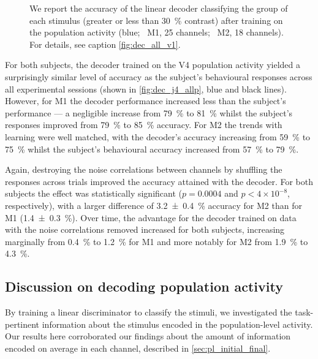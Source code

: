 \begin{figure}[htbp]
{    }
    \hspace*{\fill}
    \caption{%
    We report the accuracy of the linear decoder classifying the group of each stimulus (greater or less than \SI{30}{\percent} contrast) after training on the population activity (blue; \protect{}~\ac{M1}, \num{25} channels; \protect{}~\ac{M2}, \num{18} channels).
    For details, see caption \autoref{fig:dec_all_v1}.
}
    \label{fig:dec_all_v4}
\end{figure}

For both subjects, the decoder trained on the \ac{V4} population activity yielded a surprisingly similar level of accuracy as the subject's behavioural responses across all experimental sessions (shown in \autoref{fig:dec_j4_allp}, blue and black lines).
However, for \ac{M1} the decoder performance increased less than the subject's performance --- a negligible increase from \SI{79}{\percent} to \SI{81}{\percent} whilst the subject's responses improved from \SI{79}{\percent} to \SI{85}{\percent} accuracy.
For \ac{M2} the trends with learning were well matched, with the decoder's accuracy increasing from \SI{59}{\percent} to \SI{75}{\percent} whilst the subject's behavioural accuracy increased from \SI{57}{\percent} to \SI{79}{\percent}.

Again, destroying the noise correlations between channels by shuffling the responses across trials improved the accuracy attained with the decoder.
For both subjects the effect was statistically significant ($p=0.0004$ and $p < 4 \times 10^{-8}$, respectively), with a larger difference of \SI{+3.2\pm0.4}{\percent} accuracy for \ac{M2} than for \ac{M1} (\SI{+1.4\pm0.3}{\percent}).
Over time, the advantage for the decoder trained on data with the noise correlations removed increased for both subjects, increasing marginally from \SI{0.4}{\percent} to \SI{1.2}{\percent} for \ac{M1} and more notably for \ac{M2} from \SI{1.9}{\percent} to \SI{4.3}{\percent}.


\subsection{Discussion on decoding population activity}

By training a linear discriminator to classify the stimuli, we investigated the task-pertinent information about the stimulus encoded in the population-level activity.
Our results here corroborated our findings about the amount of information encoded on average in each channel, described in \autoref{sec:pl_initial_final}.

